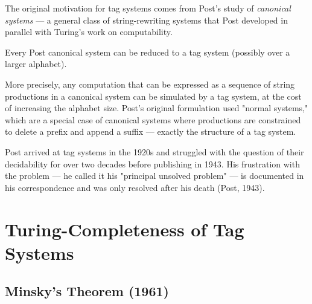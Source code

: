 The original motivation for tag systems comes from Post's study of \textit{canonical systems} --- a general class of string-rewriting systems that Post developed in parallel with Turing's work on computability.

\begin{theorem}
Every Post canonical system can be reduced to a tag system (possibly over a larger alphabet).

More precisely, any computation that can be expressed as a sequence of string productions in a canonical system can be simulated by a tag system, at the cost of increasing the alphabet size. Post's original formulation used "normal systems," which are a special case of canonical systems where productions are constrained to delete a prefix and append a suffix --- exactly the structure of a tag system.

Post arrived at tag systems in the 1920s and struggled with the question of their decidability for over two decades before publishing in 1943. His frustration with the problem --- he called it his "principal unsolved problem" --- is documented in his correspondence and was only resolved after his death (Post, 1943).
\end{theorem}

\section{Turing-Completeness of Tag Systems}

\subsection{Minsky's Theorem (1961)}

